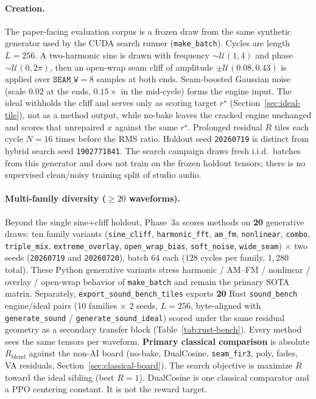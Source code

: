 \paragraph{Creation.}
The paper-facing evaluation corpus is a frozen draw from the same synthetic generator used by the CUDA search runner (\texttt{make\_batch}).
Cycles are length $L{=}256$.
A two-harmonic sine is drawn with frequency $\sim\mathcal{U}(1,4)$ and phase $\sim\mathcal{U}(0,2\pi)$, then an open-wrap seam cliff of amplitude $\pm\mathcal{U}(0.08,0.43)$ is applied over $\texttt{SEAM\_W}{=}8$ samples at both ends.
Seam-boosted Gaussian noise (scale $0.02$ at the ends, $0.15\times$ in the mid-cycle) forms the engine input.
The ideal withholds the cliff and serves only as scoring target $r^{\star}$ (Section~\ref{sec:ideal-tile}), not as a method output, while no-bake leaves the cracked engine unchanged and scores that unrepaired $x$ against the same $r^{\star}$.
Prolonged residual $R$ tiles each cycle $N{=}16$ times before the RMS ratio.
Holdout seed \texttt{20260719} is distinct from hybrid search seed \texttt{1902771841}.
The search campaign draws fresh i.i.d.\ batches from this generator and does not train on the frozen holdout tensors; there is no supervised clean/noisy training split of studio audio.

\paragraph{Multi-family diversity ($\ge 20$ waveforms).}
Beyond the single sine{+}cliff holdout, Phase~3a scores methods on \textbf{20} generative draws: ten family variants (\texttt{sine\_cliff}, \texttt{harmonic\_fft}, \texttt{am\_fm}, \texttt{nonlinear}, \texttt{combo}, \texttt{triple\_mix}, \texttt{extreme\_overlay}, \texttt{open\_wrap\_bias}, \texttt{soft\_noise}, \texttt{wide\_seam}) $\times$ two seeds (\texttt{20260719} and \texttt{20260720}), batch 64 each ($128$ cycles per family, $1{,}280$ total).
These Python generative variants stress harmonic / AM--FM / nonlinear / overlay / open-wrap behavior of \texttt{make\_batch} and remain the primary SOTA matrix.
Separately, \texttt{export\_sound\_bench\_tiles} exports \textbf{20} Rust \texttt{sound\_bench} engine/ideal pairs (10 families $\times$ 2 seeds, $L{=}256$, byte-aligned with \texttt{generate\_sound} / \texttt{generate\_sound\_ideal}) scored under the same residual geometry as a secondary transfer block (Table~\ref{tab:rust-bench}).
Every method sees the same tensors per waveform.
\textbf{Primary classical comparison} is absolute $R_{\mathrm{blend}}$ against the non-AI board (no-bake, DualCosine, \texttt{seam\_fir3}, poly, fades, VA residuals, Section~\ref{sec:classical-board}).
The search objective is maximize $R$ toward the ideal sibling (best $R{=}1$).
DualCosine is one classical comparator and a PPO centering constant.
It is not the reward target.

